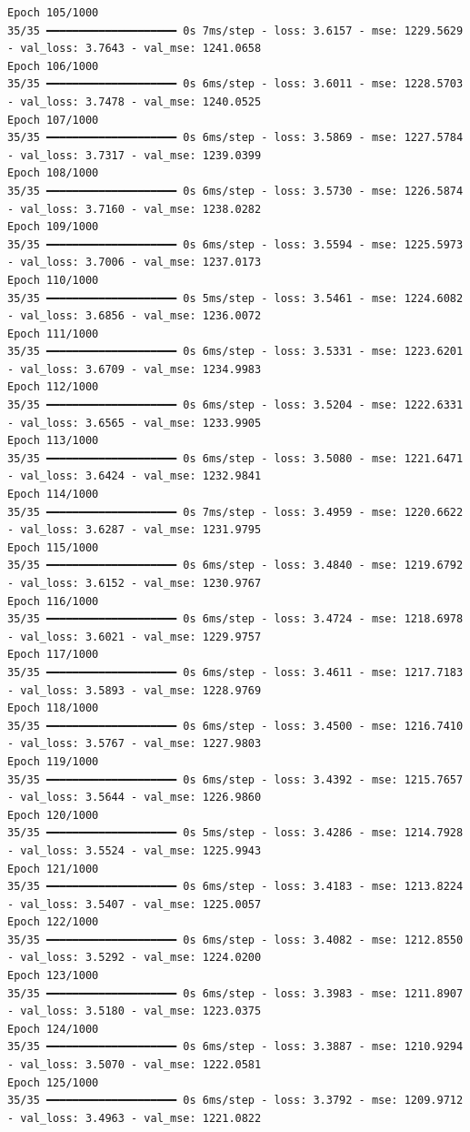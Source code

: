 \documentclass[
  letterpaper,
  DIV=11,
  numbers=noendperiod]{scrreprt}
\begin{document}
\begin{verbatim}
Epoch 105/1000
35/35 ━━━━━━━━━━━━━━━━━━━━ 0s 7ms/step - loss: 3.6157 - mse: 1229.5629 - val_loss: 3.7643 - val_mse: 1241.0658
Epoch 106/1000
35/35 ━━━━━━━━━━━━━━━━━━━━ 0s 6ms/step - loss: 3.6011 - mse: 1228.5703 - val_loss: 3.7478 - val_mse: 1240.0525
Epoch 107/1000
35/35 ━━━━━━━━━━━━━━━━━━━━ 0s 6ms/step - loss: 3.5869 - mse: 1227.5784 - val_loss: 3.7317 - val_mse: 1239.0399
Epoch 108/1000
35/35 ━━━━━━━━━━━━━━━━━━━━ 0s 6ms/step - loss: 3.5730 - mse: 1226.5874 - val_loss: 3.7160 - val_mse: 1238.0282
Epoch 109/1000
35/35 ━━━━━━━━━━━━━━━━━━━━ 0s 6ms/step - loss: 3.5594 - mse: 1225.5973 - val_loss: 3.7006 - val_mse: 1237.0173
Epoch 110/1000
35/35 ━━━━━━━━━━━━━━━━━━━━ 0s 5ms/step - loss: 3.5461 - mse: 1224.6082 - val_loss: 3.6856 - val_mse: 1236.0072
Epoch 111/1000
35/35 ━━━━━━━━━━━━━━━━━━━━ 0s 6ms/step - loss: 3.5331 - mse: 1223.6201 - val_loss: 3.6709 - val_mse: 1234.9983
Epoch 112/1000
35/35 ━━━━━━━━━━━━━━━━━━━━ 0s 6ms/step - loss: 3.5204 - mse: 1222.6331 - val_loss: 3.6565 - val_mse: 1233.9905
Epoch 113/1000
35/35 ━━━━━━━━━━━━━━━━━━━━ 0s 6ms/step - loss: 3.5080 - mse: 1221.6471 - val_loss: 3.6424 - val_mse: 1232.9841
Epoch 114/1000
35/35 ━━━━━━━━━━━━━━━━━━━━ 0s 7ms/step - loss: 3.4959 - mse: 1220.6622 - val_loss: 3.6287 - val_mse: 1231.9795
Epoch 115/1000
35/35 ━━━━━━━━━━━━━━━━━━━━ 0s 6ms/step - loss: 3.4840 - mse: 1219.6792 - val_loss: 3.6152 - val_mse: 1230.9767
Epoch 116/1000
35/35 ━━━━━━━━━━━━━━━━━━━━ 0s 6ms/step - loss: 3.4724 - mse: 1218.6978 - val_loss: 3.6021 - val_mse: 1229.9757
Epoch 117/1000
35/35 ━━━━━━━━━━━━━━━━━━━━ 0s 6ms/step - loss: 3.4611 - mse: 1217.7183 - val_loss: 3.5893 - val_mse: 1228.9769
Epoch 118/1000
35/35 ━━━━━━━━━━━━━━━━━━━━ 0s 6ms/step - loss: 3.4500 - mse: 1216.7410 - val_loss: 3.5767 - val_mse: 1227.9803
Epoch 119/1000
35/35 ━━━━━━━━━━━━━━━━━━━━ 0s 6ms/step - loss: 3.4392 - mse: 1215.7657 - val_loss: 3.5644 - val_mse: 1226.9860
Epoch 120/1000
35/35 ━━━━━━━━━━━━━━━━━━━━ 0s 5ms/step - loss: 3.4286 - mse: 1214.7928 - val_loss: 3.5524 - val_mse: 1225.9943
Epoch 121/1000
35/35 ━━━━━━━━━━━━━━━━━━━━ 0s 6ms/step - loss: 3.4183 - mse: 1213.8224 - val_loss: 3.5407 - val_mse: 1225.0057
Epoch 122/1000
35/35 ━━━━━━━━━━━━━━━━━━━━ 0s 6ms/step - loss: 3.4082 - mse: 1212.8550 - val_loss: 3.5292 - val_mse: 1224.0200
Epoch 123/1000
35/35 ━━━━━━━━━━━━━━━━━━━━ 0s 6ms/step - loss: 3.3983 - mse: 1211.8907 - val_loss: 3.5180 - val_mse: 1223.0375
Epoch 124/1000
35/35 ━━━━━━━━━━━━━━━━━━━━ 0s 6ms/step - loss: 3.3887 - mse: 1210.9294 - val_loss: 3.5070 - val_mse: 1222.0581
Epoch 125/1000
35/35 ━━━━━━━━━━━━━━━━━━━━ 0s 6ms/step - loss: 3.3792 - mse: 1209.9712 - val_loss: 3.4963 - val_mse: 1221.0822

\end{verbatim}
\end{document}
